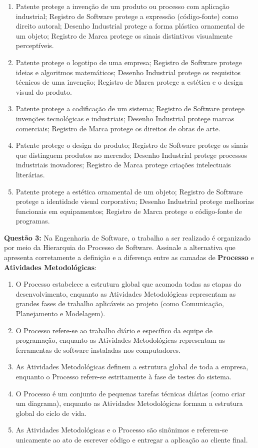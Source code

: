 \documentclass[12pt,a4paper]{article}
\begin{document}
\begin{enumerate}[label=\textbf{\Alph*)}, itemsep=0.3cm]
    \item Patente protege a invenção de um produto ou processo com aplicação industrial; Registro de Software protege a expressão (código-fonte) como direito autoral; Desenho Industrial protege a forma plástica ornamental de um objeto; Registro de Marca protege os sinais distintivos visualmente perceptíveis.
    \item Patente protege o logotipo de uma empresa; Registro de Software protege ideias e algoritmos matemáticos; Desenho Industrial protege os requisitos técnicos de uma invenção; Registro de Marca protege a estética e o design visual do produto.
    \item Patente protege a codificação de um sistema; Registro de Software protege invenções tecnológicas e industriais; Desenho Industrial protege marcas comerciais; Registro de Marca protege os direitos de obras de arte.
    \item Patente protege o design do produto; Registro de Software protege os sinais que distinguem produtos no mercado; Desenho Industrial protege processos industriais inovadores; Registro de Marca protege criações intelectuais literárias.
    \item Patente protege a estética ornamental de um objeto; Registro de Software protege a identidade visual corporativa; Desenho Industrial protege melhorias funcionais em equipamentos; Registro de Marca protege o código-fonte de programas.
\end{enumerate}

\vspace{0.8cm}
\textbf{Questão 3:} Na Engenharia de Software, o trabalho a ser realizado é organizado por meio da Hierarquia do Processo de Software. Assinale a alternativa que apresenta corretamente a definição e a diferença entre as camadas de \textbf{Processo} e \textbf{Atividades Metodológicas}:

\begin{enumerate}[label=\textbf{\Alph*)}, itemsep=0.3cm]
    \item O Processo estabelece a estrutura global que acomoda todas as etapas do desenvolvimento, enquanto as Atividades Metodológicas representam as grandes fases de trabalho aplicáveis ao projeto (como Comunicação, Planejamento e Modelagem).
    \item O Processo refere-se ao trabalho diário e específico da equipe de programação, enquanto as Atividades Metodológicas representam as ferramentas de software instaladas nos computadores.
    \item As Atividades Metodológicas definem a estrutura global de toda a empresa, enquanto o Processo refere-se estritamente à fase de testes do sistema.
    \item O Processo é um conjunto de pequenas tarefas técnicas diárias (como criar um diagrama), enquanto as Atividades Metodológicas formam a estrutura global do ciclo de vida.
    \item As Atividades Metodológicas e o Processo são sinônimos e referem-se unicamente ao ato de escrever código e entregar a aplicação ao cliente final.
\end{enumerate}
\end{document}
